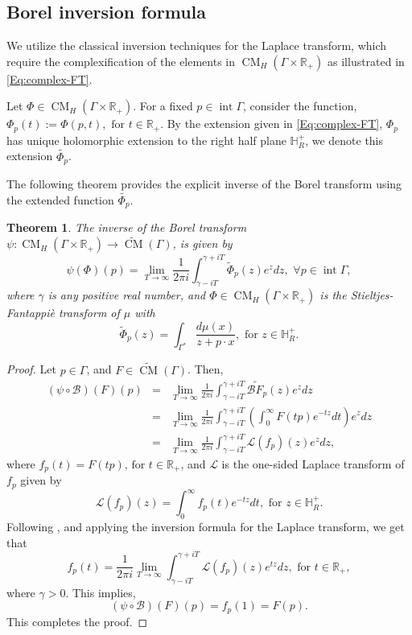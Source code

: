 \documentclass[11pt,reqno]{amsart}
\theoremstyle{plain}
\newtheorem{theorem}{Theorem}[section]
\theoremstyle{definition}
\numberwithin{equation}{section}
\newcommand{\R}{\mathbb{R}}
\newcommand{\ltt}{\left(}
\newcommand{\rtt}{\right)}
\newcommand{\beas}{\begin{eqnarray*}}
\newcommand{\eeas}{\end{eqnarray*}}
\begin{document}
    \subsection{Borel inversion formula}
    
    We utilize the classical inversion techniques for the Laplace transform, which require the complexification of the elements in ${\operatorname{CM}_H(\Gamma\times \R_+)}$ as illustrated in \eqref{Eq:complex-FT}. 
	
		Let $\Phi \in \operatorname{CM}_H(\Gamma\times \R_+)$. For a fixed $p\in \operatorname{int} \Gamma$, consider the function, $\Phi_p(t):=\Phi(p,t),\,\,\text{for } t\in\R_+$. By the extension given in \eqref{Eq:complex-FT}, $\Phi_p$ has unique holomorphic extension to the right half plane $\mathbb H^+_R$, we denote this extension $\widetilde{\Phi_p}$.
        
 The following theorem provides the explicit inverse of the Borel transform using the extended function $\widetilde{\Phi_p}$. 
	\begin{theorem}\label{th:inv borel}
		The inverse of the Borel transform $\psi:\operatorname{CM}_H(\Gamma\times \R_+)\rightarrow \widetilde{\operatorname{CM}}(\Gamma)$, is given by
		\[
		\psi(\Phi)(p)= \lim\limits_{T\rightarrow\infty}\frac{1}{2\pi i}\int_{\gamma-iT}^{\gamma+iT} \widetilde \Phi_p(z) e^z dz,\,\, \forall p\in \operatorname{int}\Gamma, 
		\]
		where $\gamma$ is any positive real number, and $\Phi \in \operatorname{CM}_H(\Gamma\times \R_+)$ is the Stieltjes-Fantappi\`e transform of $\mu$ with
		\[
		\widetilde{\Phi}_p(z)= \int_{\Gamma^*} \frac{d\mu(x)}{z+p\cdot x},\,\,\text{for } z\in \mathbb H^+_R.
        \]
	\end{theorem}
	\begin{proof}
		Let $p\in \Gamma$, and $F\in\widetilde{\operatorname{CM}}(\Gamma)$. Then,
		\beas
		(\psi\circ\mathcal B)(F)(p)&=&\lim\limits_{T\rightarrow\infty}\frac{1}{2\pi i}\int_{\gamma-iT}^{\gamma+iT} \widetilde{\mathcal{B}F_p}(z) e^z dz\\ 
		&=& \lim\limits_{T\rightarrow\infty}\frac{1}{2\pi i} \int_{\gamma-iT}^{\gamma+iT} \ltt\int_0^\infty F(tp) e^{-tz} dt\rtt e^z dz\\
		&=& \lim\limits_{T\rightarrow\infty}\frac{1}{2\pi i} \int_{\gamma-iT}^{\gamma+iT} \mathcal L(f_p)(z) e^z dz,
		\eeas 
		where $f_p(t)=F(tp),\,\text{for } t\in \R_+$, and $\mathcal L$ is the one-sided Laplace transform of $f_p$ given by
		\[
		\mathcal L(f_p)(z)=\int_0^\infty f_p(t) e^{-tz} dt,\,\, \text{for }z\in \mathbb H^+_R.
		\]
		Following \cite[Chapter~VI, Theorem~5a]{Widder}, and applying the inversion formula for the Laplace transform, we get that 
		\[
		f_p(t)=\frac{1}{2\pi i} \lim\limits_{T\rightarrow\infty}\int_{\gamma-iT}^{\gamma+iT} \mathcal L(f_p)(z) e^{tz} dz, \,\, \text{for }t\in \R_+,
		\]
		where $\gamma>0$. 
		This implies,
		\[
		(\psi\circ\mathcal B)(F)(p)=f_p(1)=F(p).
		\]
		This completes the proof.
	\end{proof}
\end{document}
